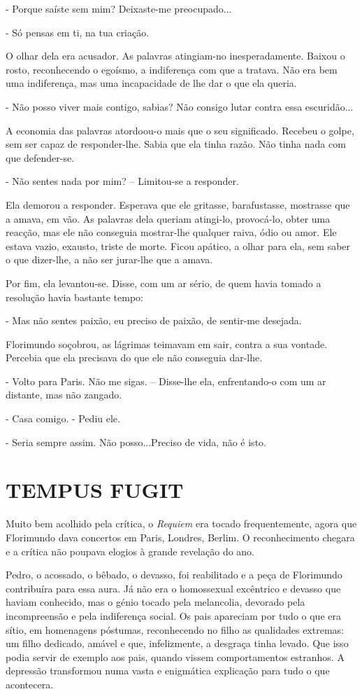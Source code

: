 - Porque saíste sem mim? Deixaste-me preocupado...

- Só pensas em ti, na tua criação.

O olhar dela era acusador. As palavras atingiam-no inesperadamente.
Baixou o rosto, reconhecendo o egoísmo, a indiferença com que a tratava.
Não era bem uma indiferença, mas uma incapacidade de lhe dar o que ela
queria.

- Não posso viver mais contigo, sabias? Não consigo lutar contra essa
escuridão...

A economia das palavras atordoou-o mais que o seu significado. Recebeu o
golpe, sem ser capaz de responder-lhe. Sabia que ela tinha razão. Não
tinha nada com que defender-se.

- Não sentes nada por mim? -- Limitou-se a responder.

Ela demorou a responder. Esperava que ele gritasse, barafustasse,
mostrasse que a amava, em vão. As palavras dela queriam atingi-lo,
provocá-lo, obter uma reacção, mas ele não conseguia mostrar-lhe
qualquer raiva, ódio ou amor. Ele estava vazio, exausto, triste de
morte. Ficou apático, a olhar para ela, sem saber o que dizer-lhe, a não
ser jurar-lhe que a amava.

Por fim, ela levantou-se. Disse, com um ar sério, de quem havia tomado a
resolução havia bastante tempo:

- Mas não sentes paixão, eu preciso de paixão, de sentir-me desejada.

Florimundo soçobrou, as lágrimas teimavam em sair, contra a sua vontade.
Percebia que ela precisava do que ele não conseguia dar-lhe.

- Volto para Paris. Não me sigas. -- Disse-lhe ela, enfrentando-o com um
ar distante, mas não zangado.

- Casa comigo. - Pediu ele.

- Seria sempre assim. Não posso...Preciso de vida, não é isto.

\section{\textbf{TEMPUS FUGIT}}

Muito bem acolhido pela crítica, o \emph{Requiem }era tocado
frequentemente, agora que Florimundo dava concertos em Paris, Londres,
Berlim. O reconhecimento chegara e a crítica não poupava elogios à
grande revelação do ano.

Pedro, o acossado, o bêbado, o devasso, foi reabilitado e a peça de
Florimundo contribuíra para essa aura. Já não era o homossexual
excêntrico e devasso que haviam conhecido, mas o génio tocado pela
melancolia, devorado pela incompreensão e pela indiferença social. Os
pais apareciam por tudo o que era sítio, em homenagens póstumas,
reconhecendo no filho as qualidades extremas: um filho dedicado, amável
e que, infelizmente, a desgraça tinha levado. Que isso podia servir de
exemplo aos pais, quando vissem comportamentos estranhos. A depressão
transformou numa vasta e enigmática explicação para tudo o que
acontecera.

